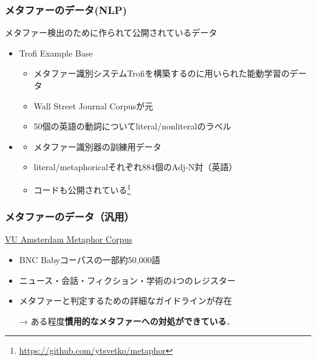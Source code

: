 \documentclass[11pt]{beamer}
\let\oldcite=\citet
\renewcommand\citet[1]{\hyperlink{#1}{\oldcite{#1}}}
\let\oldcitep=\citep
\renewcommand\citep[1]{\hyperlink{#1}{\oldcitep{#1}}}
\begin{document}
\begin{frame}
    \frametitle{メタファーのデータ(NLP)}
    メタファー検出のために作られて公開されているデータ
    \begin{itemize}
        \item Trofi Example Base \citep{birke2006,birke2007}
            \begin{itemize}
                \item メタファー識別システムTrofiを構築するのに用いられた能動学習のデータ
                \item Wall Street Journal Corpusが元
                \item 50個の英語の動詞についてliteral/nonliteralのラベル
            \end{itemize}
        \item \citet{tsvetkov2014}
            \begin{itemize}
                \item メタファー識別器の訓練用データ
                \item literal/metaphoricalそれぞれ884個のAdj-N対（英語）
                \item コードも公開されている\footnote[frame]{%
                        \url{https://github.com/ytsvetko/metaphor}
                    }
            \end{itemize}
    \end{itemize}
\end{frame}

\begin{frame}
    \frametitle{メタファーのデータ（汎用）}
    \href{http://ota.ox.ac.uk/desc/2541}{VU Amsterdam Metaphor Corpus} \citep{steen2010}
        \begin{itemize}
            \item BNC Babyコーパスの一部約50,000語

            \item ニュース・会話・フィクション・学術の4つのレジスター

            \item メタファーと判定するための詳細なガイドラインが存在

                → ある程度\textbf{慣用的なメタファーへの対処ができている}．
        \end{itemize}
\end{frame}
\end{document}
